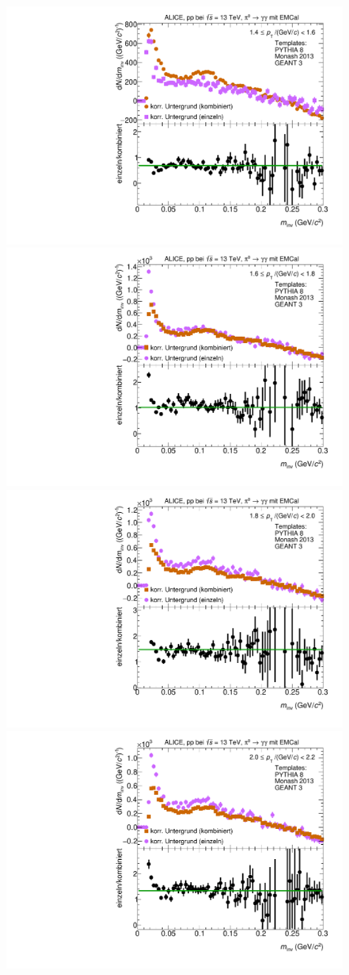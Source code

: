 \begin{figure}[t]
\centering
\begin{multicols}{2}
    \includegraphics[width=.65\linewidth]{Anhang/BackgroundWithRatio01_Data_2016.pdf}\par 
    \includegraphics[width=.65\linewidth]{Anhang/BackgroundWithRatio02_Data_2016.pdf}\par  %
\end{multicols}
\begin{multicols}{2}
    \includegraphics[width=.65\linewidth]{Anhang/BackgroundWithRatio03_Data_2016.pdf}\par
    \includegraphics[width=.65\linewidth]{Anhang/BackgroundWithRatio04_Data_2016.pdf}\par

\end{multicols}
\end{figure}
